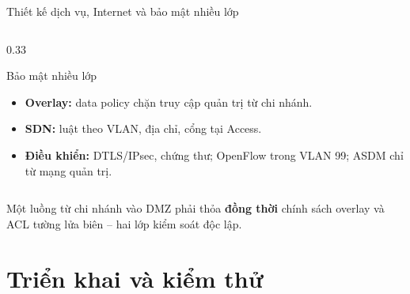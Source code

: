 \documentclass[aspectratio=169, 10pt, xcolor={table}]{beamer}
\begin{document}
\begin{frame}{Thiết kế dịch vụ, Internet và bảo mật nhiều lớp}
\begin{columns}[T]
\begin{column}{0.33\textwidth}
\begin{card}[okGreen]{Bảo mật nhiều lớp}
\begin{itemize}
                    \item \textbf{Overlay:} data policy chặn truy cập quản trị từ chi nhánh.
                    \item \textbf{SDN:} luật theo VLAN, địa chỉ, cổng tại Access.
                    \item \textbf{Điều khiển:} DTLS/IPsec, chứng thư; OpenFlow trong VLAN 99; ASDM chỉ từ mạng quản trị.
                \end{itemize}
            \end{card}
        \end{column}
    \end{columns}
    \vspace{-0.05cm}
    \begin{softcard}\scriptsize
        Một luồng từ chi nhánh vào DMZ phải thỏa \textbf{đồng thời} chính sách overlay và ACL tường lửa biên -- hai lớp kiểm soát độc lập.
    \end{softcard}
\end{frame}

\section{Triển khai và kiểm thử}
\end{document}
